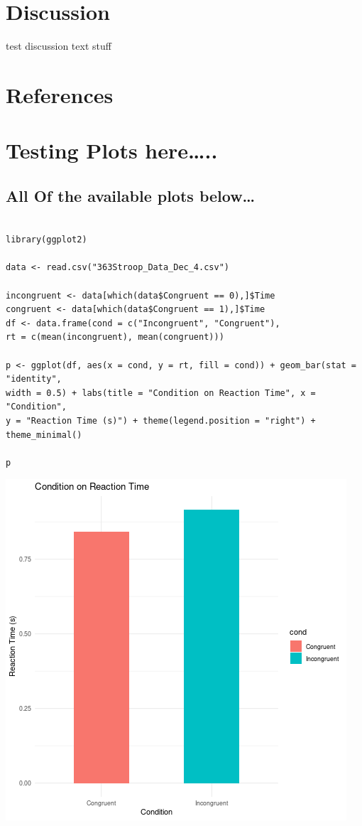 \documentclass{article}
\begin{document}
\section{Discussion}
\label{sec:orgd10796d}
test discussion text stuff

\section{References}
\label{sec:orge331b19}



\section{Testing Plots here\ldots{}..}
\label{sec:org0f20991}

\subsection{All Of the available plots below\ldots{}}
\label{sec:orgcb0be49}

\begin{verbatim}

library(ggplot2)

data <- read.csv("363Stroop_Data_Dec_4.csv")

incongruent <- data[which(data$Congruent == 0),]$Time
congruent <- data[which(data$Congruent == 1),]$Time
df <- data.frame(cond = c("Incongruent", "Congruent"), 
rt = c(mean(incongruent), mean(congruent)))

p <- ggplot(df, aes(x = cond, y = rt, fill = cond)) + geom_bar(stat = "identity", 
width = 0.5) + labs(title = "Condition on Reaction Time", x = "Condition",
y = "Reaction Time (s)") + theme(legend.position = "right") + theme_minimal()

p
\end{verbatim}

\begin{center}
\includegraphics[width=.9\linewidth]{barplot_stroop.png}
\end{center}
\end{document}

